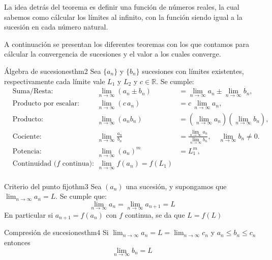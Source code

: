 \begin{nota}
    La idea detrás del teorema es definir una función de números reales, la cual sabemos como cálcular los límites al infinito, con la función siendo igual a la sucesión en cada número natural.
\end{nota}

A continuación se presentan los diferentes teoremas con los que contamos para cálcular la convergencia de sucesiones y el valor a los cuales converge.

\begin{teorema}{Álgebra de sucesiones}{thm2}
    Sea $\{a_n\}$ y $\{b_n\}$ sucesiones con límites existentes, respectivamente cada límite vale $L_1$ y $L_2$ y $c\in\mathbb{R}$. Se cumple:
    \[
    \begin{aligned}
        &\text{Suma/Resta:} & \lim_{n \to \infty} (a_n \pm b_n) &= \lim_{n \to \infty} a_n \pm \lim_{n \to \infty} b_n,\\
        &\text{Producto por escalar:} & \lim_{n \to \infty} (c\,a_n) &= c\,\lim_{n \to \infty} a_n,\\
        &\text{Producto:} & \lim_{n \to \infty} (a_n b_n) &= (\lim_{n \to \infty} a_n)(\lim_{n \to \infty} b_n),\\
        &\text{Cociente:} & \lim_{n \to \infty} \frac{a_n}{b_n} &= \frac{\lim\limits_{n \to \infty} a_n}{\lim\limits_{n \to \infty} b_n}, \quad \lim_{n\to\infty} b_n \neq 0. \\
        &\text{Potencia:} & \lim_{n \to \infty} (a_n)^m &= L_1^m,\\
        &\text{Continuidad ($f$ continua): } & \lim_{n \to \infty}f(a_n) = f(L_1) \\
    \end{aligned}
    \]
\end{teorema}

\begin{teorema}{Criterio del punto fijo}{thm3}
    Sea $(a_n)$ una sucesión, y supongamos que $\lim_{n \to \infty} a_n = L$. Se cumple que:
    \[ 
        \lim_{n \to \infty} a_n = \lim_{n \to \infty} a_{n + 1} = L
    \]
    En particular si $a_{n + 1} = f(a_n)$ con $f$ continua, se da que $L = f(L)$
\end{teorema}

\begin{teorema}{Compresión de sucesiones}{thm4}
    Si $\lim_{n \to \infty} a_n = L = \lim_{n \to \infty} c_n$ y $a_n \leq b_n \leq c_n$ entonces
    \[ 
        \lim_{n \to \infty} b_n = L
    \]
\end{teorema}

